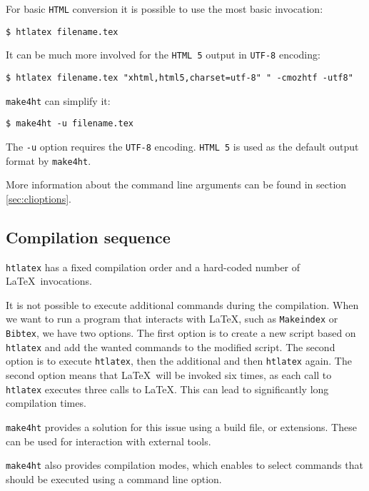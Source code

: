 For basic \texttt{HTML} conversion it is possible to use the most basic
invocation:

\begin{verbatim}
$ htlatex filename.tex
\end{verbatim}

It can be much more involved for the \texttt{HTML\ 5} output in
\texttt{UTF-8} encoding:

\begin{verbatim}
$ htlatex filename.tex "xhtml,html5,charset=utf-8" " -cmozhtf -utf8"
\end{verbatim}

\texttt{make4ht} can simplify it:

\begin{verbatim}
$ make4ht -u filename.tex
\end{verbatim}

The \texttt{-u} option requires the \texttt{UTF-8} encoding.
\texttt{HTML\ 5} is used as the default output format by
\texttt{make4ht}.

More information about the command line arguments can be found in
section \ref{sec:clioptions}.

\hypertarget{compilation-sequence}{%
\subsection{Compilation sequence}\label{compilation-sequence}}

\texttt{htlatex} has a fixed compilation order and a hard-coded number
of \LaTeX~invocations.

It is not possible to execute additional commands during the
compilation. When we want to run a program that interacts with \LaTeX,
such as \texttt{Makeindex} or \texttt{Bibtex}, we have two options. The
first option is to create a new script based on \texttt{htlatex} and add
the wanted commands to the modified script. The second option is to
execute \texttt{htlatex}, then the additional and then \texttt{htlatex}
again. The second option means that \LaTeX~will be invoked six times, as
each call to \texttt{htlatex} executes three calls to \LaTeX. This can
lead to significantly long compilation times.

\texttt{make4ht} provides a solution for this issue using a build file,
or extensions. These can be used for interaction with external tools.

\texttt{make4ht} also provides compilation modes, which enables to
select commands that should be executed using a command line option.

